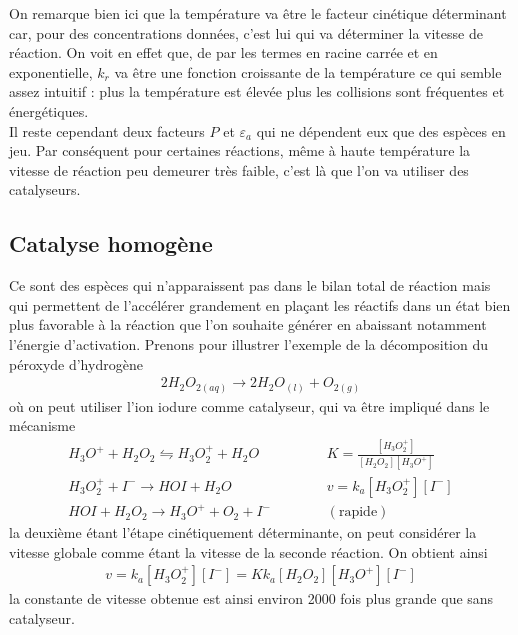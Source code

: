 \documentclass[12pt,prb,aps,epsf]{report}
\begin{document}
On remarque bien ici que la température va être le facteur cinétique déterminant car, pour des concentrations données, c'est lui qui va déterminer la vitesse de réaction. On voit en effet que, de par les termes en racine carrée et en exponentielle, $k_r$ va être une fonction croissante de la température ce qui semble assez intuitif : plus la température est élevée plus les collisions sont fréquentes et énergétiques.\\

Il reste cependant deux facteurs $P$ et $\varepsilon_a$ qui ne dépendent eux que des espèces en jeu. Par conséquent pour certaines réactions, même à haute température la vitesse de réaction peu demeurer très faible, c'est là que l'on va utiliser des catalyseurs.

\subsection{Catalyse homogène}
Ce sont des espèces qui n'apparaissent pas dans le bilan total de réaction mais qui permettent de l'accélérer grandement en plaçant les réactifs dans un état bien plus favorable à la réaction que l'on souhaite générer en abaissant notamment l'énergie d'activation. Prenons pour illustrer l'exemple de la décomposition du péroxyde d'hydrogène
\begin{eqnarray}
2H_2O_{2(aq)} \longrightarrow 2 H_2O_{(l)} + O_{2(g)}
\end{eqnarray}
où on peut utiliser l'ion iodure comme catalyseur, qui va être impliqué dans le mécanisme 
\begin{eqnarray}
H_3O^+ + H_2O_2 \leftrightharpoons H_3O_2^+ + H_2O &\hspace{1cm}& K = \frac{[H_3O_2^+]}{[H_2O_2][H_3O^+]}\\
H_3O_2^+ + I^- \rightarrow HOI + H_2O &\hspace{1cm}& v = k_a[H_3O_2^+][I^-]\\
HOI + H_2O_2 \rightarrow H_3O^+ +O_2 + I^- &\hspace{1cm}& \mathrm{(rapide)}
\end{eqnarray}
la deuxième étant l'étape cinétiquement déterminante, on peut considérer la vitesse globale comme étant la vitesse de la seconde réaction. On obtient ainsi 
\begin{eqnarray}
v  = k_a[H_3O_2^+][I^-] = Kk_a [H_2O_2][H_3O^+][I^-]
\end{eqnarray}
la constante de vitesse obtenue est ainsi environ 2000 fois plus grande que sans catalyseur.
\end{document}
